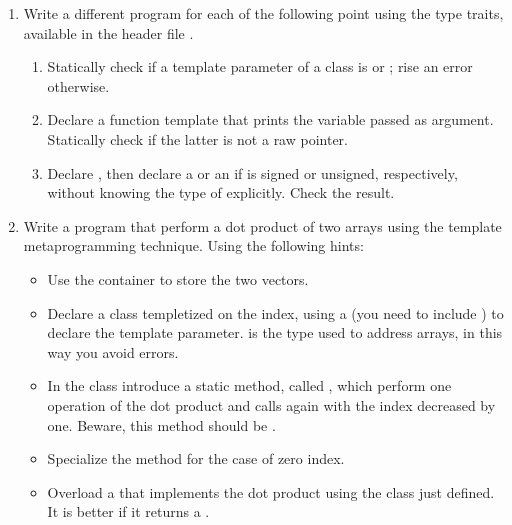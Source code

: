 \begin{enumerate}

    \item Write a different program for each of the following point using the type traits,
    available in the header file .
    \begin{enumerate}

        \item Statically check if a template parameter of a class is  or
        ; rise an error otherwise.

        \item Declare a function template that prints the variable passed as
        argument. Statically check if the latter is not a raw pointer.

        \item Declare , then declare a  or an
         if  is signed or unsigned, respectively, without knowing
        the type of  explicitly. Check the result.

    \end{enumerate}

    \item Write a program that perform a dot product of two arrays using the template
    metaprogramming technique. Using the following hints:

    \begin{itemize}

        \item Use the container  to store the two vectors.

        \item Declare a class templetized on the index, using a 
        (you need to include ) to declare the template parameter.
         is the type used to address arrays, in this way you avoid
        errors.

        \item In the class introduce a static method, called , which
        perform one operation of the dot product and calls again  with
        the index decreased by one. Beware, this method should be .

        \item Specialize the method  for the case of zero index.

        \item Overload a  that implements the dot product using the
        class just defined.  It is better if it returns a .

    \end{itemize}

\end{enumerate}
